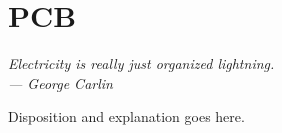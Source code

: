 \chapter{PCB}\label{ch:pcb}

\begin{flushright}{\slshape
    Electricity is really just organized lightning.\\ \medskip
    --- George Carlin}
\end{flushright}

Disposition and explanation goes here. 


%



%



